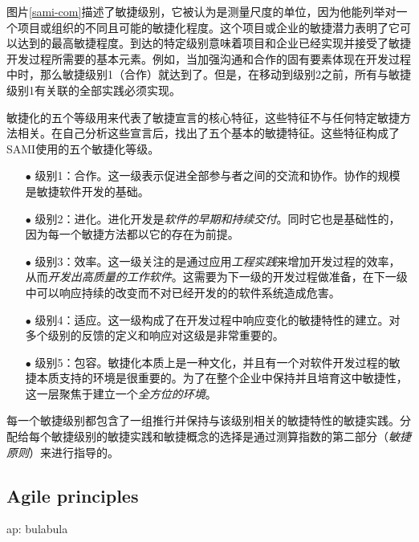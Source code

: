 \documentclass[twocolumn]{svjour3}[]
\begin{document}
图片\ref{sami-com}描述了敏捷级别，它被认为是测量尺度的单位，因为他能列举对一个项目或组织的不同且可能的敏捷化程度。这个项目或企业的敏捷潜力表明了它可以达到的最高敏捷程度。到达的特定级别意味着项目和企业已经实现并接受了敏捷开发过程所需要的基本元素。例如，当加强沟通和合作的固有要素体现在开发过程中时，那么敏捷级别1（合作）就达到了。但是，在移动到级别2之前，所有与敏捷级别1有关联的全部实践必须实现。

敏捷化的五个等级用来代表了敏捷宣言的核心特征\cite{agilemanifestoo2001agile}，这些特征不与任何特定敏捷方法相关。在自己分析这些宣言后，找出了五个基本的敏捷特征。这些特征构成了SAMI使用的五个敏捷化等级。

\begin{itemize}
    \item[$\bullet$] 级别1：合作。这一级表示促进全部参与者之间的交流和协作。协作的规模是敏捷软件开发的基础\cite{cockburn2001agile,cockburn2001agilesoftware,tabaka2006collaboration}。
    \item[$\bullet$] 级别2：进化。进化开发是\textit{软件的早期和持续交付}。同时它也是基础性的，因为每一个敏捷方法都以它的存在为前提\cite{larman2004agile}。
    \item[$\bullet$] 级别3：效率。这一级关注的是通过应用\textit{工程实践}来增加开发过程的效率，从而\textit{开发出高质量的工作软件}。这需要为下一级的开发过程做准备，在下一级中可以响应持续的改变而不对已经开发的的软件系统造成危害\cite{cockburn2001agilesoftware,hunt2006agile}。
    \item[$\bullet$] 级别4：适应。这一级构成了在开发过程中响应变化的敏捷特性的建立。对多个级别的反馈的定义和响应对这级是非常重要的\cite{highsmith2002agile}。
    \item[$\bullet$] 级别5：包容。敏捷化本质上是一种文化，并且有一个对软件开发过程的敏捷本质支持的环境是很重要的。为了在整个企业中保持并且培育这中敏捷性，这一层聚焦于建立一个\textit{全方位的环境}。
\end{itemize}

每一个敏捷级别都包含了一组推行并保持与该级别相关的敏捷特性的敏捷实践。分配给每个敏捷级别的敏捷实践和敏捷概念的选择是通过测算指数的第二部分（\textit{敏捷原则}）来进行指导的。

\subsection{Agile principles}
\label{ap}

ap: bulabula



\end{document}
